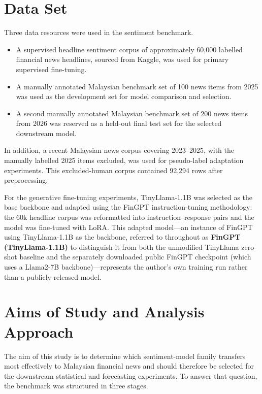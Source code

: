 \documentclass[12pt]{ucetd}
\begin{document}
\section{Data Set}
Three data resources were used in the sentiment benchmark.

\begin{itemize}
    \item A supervised headline sentiment corpus of approximately 60,000 labelled financial news headlines, sourced from Kaggle, was used for primary supervised fine-tuning.
    \item A manually annotated Malaysian benchmark set of 100 news items from 2025 was used as the development set for model comparison and selection.
    \item A second manually annotated Malaysian benchmark set of 200 news items from 2026 was reserved as a held-out final test set for the selected downstream model.
\end{itemize}

In addition, a recent Malaysian news corpus covering 2023--2025, with the manually labelled 2025 items excluded, was used for pseudo-label adaptation experiments. This excluded-human corpus contained 92,294 rows after preprocessing.

For the generative fine-tuning experiments, TinyLlama-1.1B was selected as the base backbone and adapted using the FinGPT instruction-tuning methodology: the 60k headline corpus was reformatted into instruction--response pairs and the model was fine-tuned with LoRA. This adapted model---an instance of FinGPT using TinyLlama-1.1B as the backbone, referred to throughout as \textbf{FinGPT (TinyLlama-1.1B)} to distinguish it from both the unmodified TinyLlama zero-shot baseline and the separately downloaded public FinGPT checkpoint (which uses a Llama2-7B backbone)---represents the author's own training run rather than a publicly released model.

\section{Aims of Study and Analysis Approach}
The aim of this study is to determine which sentiment-model family transfers most effectively to Malaysian financial news and should therefore be selected for the downstream statistical and forecasting experiments. To answer that question, the benchmark was structured in three stages.
\end{document}
